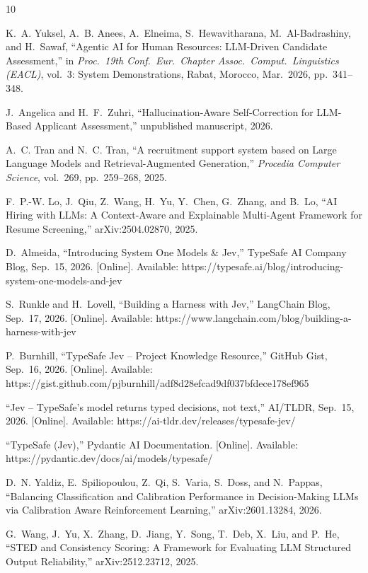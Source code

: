 \documentclass[journal]{IEEEtran}
\begin{document}
\begin{thebibliography}{10}

K.~A. Yuksel, A.~B. Anees, A.~Elneima, S.~Hewavitharana, M.~Al-Badrashiny, and H.~Sawaf, ``Agentic AI for Human Resources: LLM-Driven Candidate Assessment,'' in \emph{Proc.\ 19th Conf.\ Eur.\ Chapter Assoc.\ Comput.\ Linguistics (EACL)}, vol.~3: System Demonstrations, Rabat, Morocco, Mar.~2026, pp.~341--348.

J.~Angelica and H.~F.~Zuhri, ``Hallucination-Aware Self-Correction for LLM-Based Applicant Assessment,'' unpublished manuscript, 2026.

A.~C. Tran and N.~C. Tran, ``A recruitment support system based on Large Language Models and Retrieval-Augmented Generation,'' \emph{Procedia Computer Science}, vol.~269, pp.~259--268, 2025.

F.~P.-W. Lo, J.~Qiu, Z.~Wang, H.~Yu, Y.~Chen, G.~Zhang, and B.~Lo, ``AI Hiring with LLMs: A Context-Aware and Explainable Multi-Agent Framework for Resume Screening,'' arXiv:2504.02870, 2025.

D.~Almeida, ``Introducing System One Models \& Jev,'' TypeSafe AI Company Blog, Sep.~15, 2026. [Online]. Available: https://typesafe.ai/blog/introducing-system-one-models-and-jev

S.~Runkle and H.~Lovell, ``Building a Harness with Jev,'' LangChain Blog, Sep.~17, 2026. [Online]. Available: https://www.langchain.com/blog/building-a-harness-with-jev

P.~Burnhill, ``TypeSafe Jev -- Project Knowledge Resource,'' GitHub Gist, Sep.~16, 2026. [Online]. Available: https://gist.github.com/pjburnhill/adf8d28efcad9df037bfdece178ef965

``Jev -- TypeSafe's model returns typed decisions, not text,'' AI/TLDR, Sep.~15, 2026. [Online]. Available: https://ai-tldr.dev/releases/typesafe-jev/

``TypeSafe (Jev),'' Pydantic AI Documentation. [Online]. Available: https://pydantic.dev/docs/ai/models/typesafe/

D.~N. Yaldiz, E.~Spiliopoulou, Z.~Qi, S.~Varia, S.~Doss, and N.~Pappas, ``Balancing Classification and Calibration Performance in Decision-Making LLMs via Calibration Aware Reinforcement Learning,'' arXiv:2601.13284, 2026.

G.~Wang, J.~Yu, X.~Zhang, D.~Jiang, Y.~Song, T.~Deb, X.~Liu, and P.~He, ``STED and Consistency Scoring: A Framework for Evaluating LLM Structured Output Reliability,'' arXiv:2512.23712, 2025.


\end{thebibliography}
\end{document}
